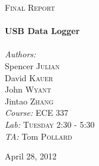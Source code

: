 \begin{titlepage}
\begin{center}

\textsc{\Large Final Report}\\[0.5cm]


\HRule \\[0.4cm]
{ \huge \bfseries USB Data Logger}\\[0.4cm]

\HRule \\[1.5cm]

\large
\emph{Authors:}\\
Spencer \textsc{Julian}\\
David \textsc{Kauer}\\
John \textsc{Wyant}\\
Jintao \textsc{Zhang}\\
\vfill
\large
\emph{Course:} \textsc{ECE 337}\\
\emph{Lab:} \textsc{Tuesday 2:30 - 5:30}\\
\emph{TA:} Tom \textsc{Pollard}

\vfill

\large April 28, 2012

\end{center}

\end{titlepage}

